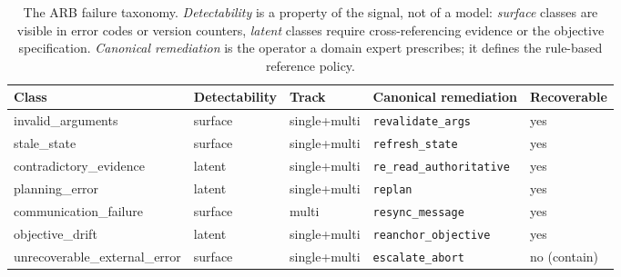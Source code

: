 \begin{table}[t]
\centering\small
\caption{The ARB failure taxonomy. \emph{Detectability} is a property of the
signal, not of a model: \emph{surface} classes are visible in error codes or
version counters, \emph{latent} classes require cross-referencing evidence or
the objective specification. \emph{Canonical remediation} is the operator a
domain expert prescribes; it defines the rule-based reference policy.}
\label{tab:taxonomy}
\begin{adjustbox}{max width=\textwidth}
\begin{tabular}{@{}lllll@{}}
\toprule
Class & Detectability & Track & Canonical remediation & Recoverable \\
\midrule
invalid\_arguments & surface & single+multi & \texttt{revalidate\_args} & yes \\
stale\_state & surface & single+multi & \texttt{refresh\_state} & yes \\
contradictory\_evidence & latent & single+multi & \texttt{re\_read\_authoritative} & yes \\
planning\_error & latent & single+multi & \texttt{replan} & yes \\
communication\_failure & surface & multi & \texttt{resync\_message} & yes \\
objective\_drift & latent & single+multi & \texttt{reanchor\_objective} & yes \\
unrecoverable\_external\_error & surface & single+multi & \texttt{escalate\_abort} & no (contain) \\
\bottomrule
\end{tabular}
\end{adjustbox}
\end{table}
